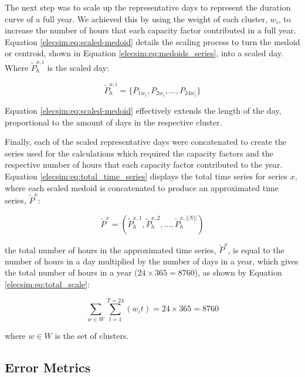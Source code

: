 The next step was to scale up the representative days to represent the duration curve of a full year. We achieved this by using the weight of each cluster, $w_i$, to increase the number of hours that each capacity factor contributed in a full year. Equation \ref{elecsim:eq:scaled-medoid} details the scaling process to turn the medoid or centroid, shown in Equation \ref{elecsim:eq:medoids_series}, into a scaled day. Where $\widetilde{P}^{x,i}_{h}$ is the scaled day:

\begin{equation}
\label{elecsim:eq:scaled-medoid}
\widetilde{P}^{x,i}_{h} =  \{P_{1w_i}, P_{2w_i}, \ldots, P_{24w_i}\}
\end{equation} 

\noindent Equation \ref{elecsim:eq:scaled-medoid} effectively extends the length of the day, proportional to the amount of days in the respective cluster.



Finally, each of the scaled representative days were concatenated to create the series used for the calculations which required the capacity factors and the respective number of hours that each capacity factor contributed to the year. Equation \ref{elecsim:eq:total_time_series} displays the total time series for series $x$, where each scaled medoid is concatenated to produce an approximated time series, $\widetilde{P}^x$:


\begin{equation}
\label{elecsim:eq:total_time_series}
\widetilde{P}^x=\left(\widetilde{P}^{x,1}_{h},\widetilde{P}^{x,2}_{h},\ldots, \widetilde{P}^{x,||N||}_{h}\right)
\end{equation}

\noindent the total number of hours in the approximated time series, $\widetilde{P}^x$, is equal to the number of hours in a day multiplied by the number of days in a year, which gives the total number of hours in a year ($24\times 365=8760$), as shown by Equation \ref{elecsim:eq:total_scale}:


\begin{equation}
\label{elecsim:eq:total_scale}
\sum\limits_{w\in W}\sum\limits_{t=1}^{T=24}\left(w_i t\right)=24\times 365=8760
\end{equation}

\noindent where $w\in W$ is the set of clusters.

\subsection{Error Metrics}

